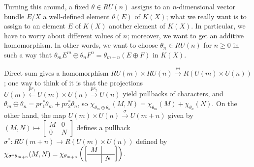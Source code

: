 \documentclass{article}
\newcommand{\from}{\leftarrow}
\begin{document}
Turning this around, a fixed $\theta \in R U(n)$ assigns to an $n$-dimensional vector bundle $E / X$ a well-defined element $\theta(E)$ of $K(X)$; what we really want is to assign to an element $E$ of $K(X)$ another element of $K(X)$.  In particular, we have to worry about different values of $n$; moreover, we want to get an additive homomorphism.  In other words, we want to choose $\theta_n \in RU(n)$ for $n \ge 0$ in such a way that $\theta_m E^m \oplus \theta_n F^n = \theta_{m+n}(E \oplus F)$ in $K(X)$.

Direct sum gives a homomorphism $RU(m) \times RU(n) \stackrel{\oplus}{\to} R(U(m) \times U(n))$; one way to think of it is that the projections $U(m) \stackrel{pr_1}{\from} U(m) \times U(n) \stackrel{pr_2}{\to} U(n)$ yield pullbacks of characters, and $\theta_m \oplus \theta_n = pr_1^* \theta_m + pr_2^* \theta_n$, so $\chi_{\theta_m \oplus \theta_n}(M, N) = \chi_{\theta_m}(M) + \chi_{\theta_n}(N)$.  On the other hand, the map $U(m) \times U(n) \stackrel{\sigma}{\to} U(m+n)$ given by $(M, N) \mapsto \left[\begin{array}{c|c}M & 0 \\ \hline 0 & N\end{array}\right]$ defines a pullback $\sigma^*: RU(m+n) \to R(U(m) \times U(n))$ defined by $\chi_{\sigma^* \theta_{m+n}}(M, N) = \chi_{\theta_{m+n}}\left( \left[\begin{array}{c|c}M \\ \hline & N\end{array}\right] \right)$.
\end{document}
